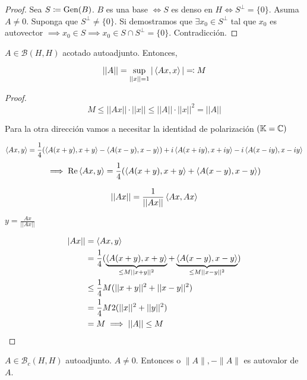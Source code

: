 \begin{proof}
   Sea $S\coloneqq \operatorname{Gen}(B)$. $B$ es una base $\iff S$ es denso en $H\iff S^\perp=\{0\}$. Asuma $A\neq 0$. Suponga que $S^\perp\neq \{0\}$. Si demostramos que $\exists x_0\in S^\perp$ tal que $x_0$ es autovector $\implies x_0\in S\implies x_0\in S\cap S^\perp=\{0\}$. Contradicción.
\end{proof}

\begin{flemma}
   $A\in \mathcal{B}(H,H)$ acotado autoadjunto. Entonces,

   \[||A||=\sup_{||x||=1}|\left\langle Ax,x\right\rangle|\eqqcolon M\]
\end{flemma}

\begin{proof}
   \[M\leq ||Ax||\cdot||x||\leq ||A||\cdot||x||^2=||A||\]

   Para la otra dirección vamos a necesitar la identidad de polarización $(\mathbb{K}=\mathbb{C})$

   \[\left\langle Ax,y\right\rangle=\frac{1}{4}(\left\langle A(x+y),x+y\right\rangle-\left\langle A(x-y),x-y\right\rangle)+i\left\langle A(x+iy),x+iy\right\rangle-i\left\langle A(x-iy),x-iy\right\rangle\]
   \[\implies \operatorname{Re} \left\langle Ax,y\right\rangle=\frac{1}{4}(\left\langle A(x+y),x+y\right\rangle+\left\langle A(x-y),x-y\right\rangle)\]

   \begin{align*}
      ||Ax||=\frac{1}{||Ax||}\left\langle Ax,Ax\right\rangle
   \end{align*}

   $y=\frac{Ax}{||Ax||}$

   \begin{align*}
      |Ax||&=\left\langle Ax,y\right\rangle\\
      &=\frac{1}{4}(\underbrace{\left\langle A(x+y),x+y\right\rangle}_{\leq M||x+y||^2}+\underbrace{\left\langle A(x-y),x-y\right\rangle}_{\leq M||x-y||^2})\\
      &\leq \frac{1}{4}M(||x+y||^2+||x-y||^2)\\
      &=\frac{1}{4}M2(||x||^2+||y||^2)\\
      &=M\implies ||A||\leq M
   \end{align*}
\end{proof}

\begin{flemma}
   $A\in\mathcal{B}_c(H,H)$ autoadjunto. $A\neq 0$. Entonces o $\|A\|,-\|A\|$ es autovalor de $A$.
\end{flemma}

